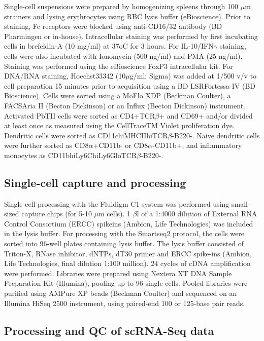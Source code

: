 Single-cell suspensions were prepared by homogenizing spleens through 100 \( \mu \)m strainers and lysing erythrocytes using RBC lysis buffer (eBioscience). Prior to staining, Fc receptors were blocked using anti-CD16/32 antibody (BD Pharmingen or in-house). Intracellular staining was performed by first incubating cells in brefeldin-A (10 mg/ml) at 37oC for 3 hours. For IL-10/IFN\( \gamma \) staining, cells were also incubated with Ionomycin (500 ng/ml) and PMA (25 ng/ml). Staining was performed using the eBioscience FoxP3 intracellular kit. For DNA/RNA staining, Hoechst33342 (10\( \mu \)g/ml; Sigma) was added at 1/500 v/v to cell preparation 15 minutes prior to acquisition using a BD LSRFortessa IV (BD Bioscience). Cells were sorted using a MoFlo XDP (Beckman Coulter), a FACSAria II (Becton Dickinson) or an Influx (Becton Dickinson) instrument. Activated PbTII cells were sorted as CD4+TCR\( \beta \)+ and CD69+ and/or divided at least once as measured using the CellTraceTM Violet proliferation dye. Dendritic cells were sorted as CD11chiMHCIIhiTCR\( \beta \)-B220-. Naive dendritic cells were further sorted as CD8\( \alpha \)+CD11b- or CD8\( \alpha \)-CD11b+, and inflammatory monocytes as CD11bhiLy6ChiLy6GloTCR\( \beta \)-B220-.

\subsection{Single-cell capture and processing}

Single cell processing with the Fluidigm C1 system was performed using small–sized capture chips (for 5-10 \( \mu \)m cells). 1 \( \beta \)l of a 1:4000 dilution of External RNA Control Consortium (ERCC) spikeins (Ambion, Life Technologies) was included in the lysis buffer. For processing with the Smartseq2 protocol, the cells were sorted into 96-well plates containing lysis buffer. The lysis buffer consisted of Triton-X, RNase inhibitor, dNTPs, dT30 primer and ERCC spike-ins (Ambion, Life Technologies, final dilution 1:100 million). 24 cycles of cDNA amplification were performed. Libraries were prepared using Nextera XT DNA Sample Preparation Kit (Illumina), pooling up to 96 single cells. Pooled libraries were purified using AMPure XP beads (Beckman Coulter) and sequenced on an Illumina HiSeq 2500 instrument, using paired-end 100 or 125-base pair reads.

\subsection{Processing and QC of scRNA-Seq data}

